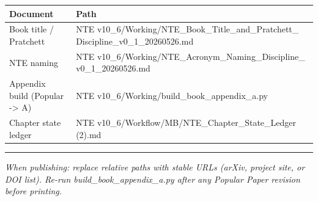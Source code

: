 \documentclass[
  11pt,
]{article}
\newcounter{none} %
\begin{document}
{\def\LTcaptype{none} %
\begin{longtable}[]{@{}
  >{\raggedright\arraybackslash}p{}
  >{\raggedright\arraybackslash}p{}@{}}
\toprule\noalign{}
\begin{minipage}[b]{\linewidth}\raggedright
Document
\end{minipage} & \begin{minipage}[b]{\linewidth}\raggedright
Path
\end{minipage} \\
\midrule\noalign{}
\endhead
\bottomrule\noalign{}
\endlastfoot
Book title / Pratchett & NTE
v10\_6/Working/NTE\_Book\_Title\_and\_Pratchett\_
Discipline\_v0\_1\_20260526.md \\
NTE naming & NTE v10\_6/Working/NTE\_Acronym\_Naming\_Discipline\_
v0\_1\_20260526.md \\
Appendix build (Popular -\textgreater{} A) & NTE
v10\_6/Working/build\_book\_appendix\_a.py \\
Chapter state ledger & NTE
v10\_6/Workflow/MB/NTE\_Chapter\_State\_Ledger (2).md \\
\end{longtable}
}

\begin{center}\rule{0.5\linewidth}{0.5pt}\end{center}

\emph{When publishing: replace relative paths with stable URLs (arXiv,
project site, or DOI list). Re-run build\_book\_appendix\_a.py after any
Popular Paper revision before printing.}
\end{document}
